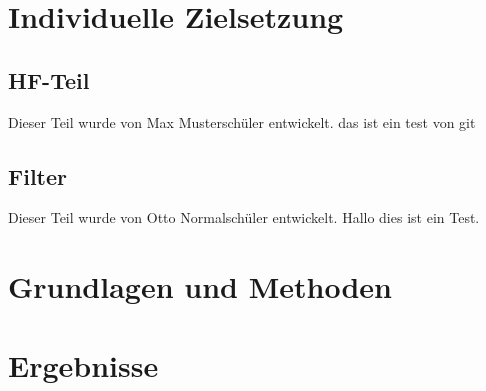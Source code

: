 \documentclass[paper=a4, 12pt]{scrreprt}
\begin{document}
\chapter{Individuelle Zielsetzung}
    \section{HF-Teil}
        Dieser Teil wurde von Max Musterschüler entwickelt. das ist ein test von git
    
    \section{Filter}
        Dieser Teil wurde von Otto Normalschüler entwickelt.
		Hallo dies ist ein Test.
\chapter{Grundlagen und Methoden}

\chapter{Ergebnisse}


\appendix



\setcounter{lofdepth}{2}
\dipalistoffigures

\setcounter{lotdepth}{2}
\dipalistoftables



\newpage




\end{document}
